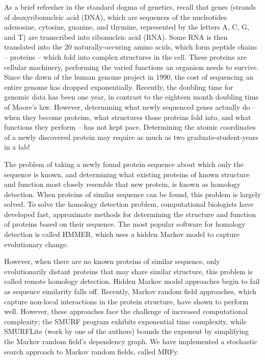 \documentclass[preprint]{sigplanconf}
\begin{document}
As a brief refresher in the standard dogma of genetics, recall that genes 
(strands of deoxyribonucleic acid (DNA), which are sequences of the nucleotides 
adenosine, cytosine, guanine, and thymine, represented by the letters A, C, G, 
and T) are transcribed into ribonucleic acid (RNA). Some RNA is then translated 
into the 20 naturally-occuring amino acids, which form peptide chains -- 
proteins -- which fold into complex structures in the cell. These proteins are 
cellular machinery, performing the varied functions an organism needs to 
survive. Since the dawn of the human genome project in 1990, the cost of 
sequencing an entire genome has dropped exponentially. Recently, the doubling 
time for genomic data has been one year, in contrast to the eighteen month 
doubling time of Moore's law. However, determining what newly sequenced genes 
actually do -- when they become proteins, what structures those proteins fold 
into, and what functions they perform -- has not kept pace. Determining the 
atomic coordinates of a newly discovered protein may require as much as two 
graduate-student-years in a lab!

The problem of taking a newly found protein sequence about which only the 
sequence is known, and determining what existing proteins of known structure 
and function most closely resemble that new protein, is known as homology 
detection. When proteins of similar sequence can be found, this problem is 
largely solved. To solve the homology detection problem, computational 
biologists have developed fast, approximate methods for determining the 
structure and function of proteins based on their sequence. The most popular 
software for homology detection is called HMMER, which uses a hidden Markov 
model to capture evolutionary change.

However, when there are no known proteins of similar sequence, only 
evolutionarily distant proteins that may share similar structure, this problem 
is called remote homology detection. Hidden Markov model approaches begin to 
fail as sequence similarity falls off. Recently, Markov random field 
approaches, which capture non-local interactions in the protein structure, have 
shown to perform well. However, these approaches face the challenge of 
increased computational complexity; the SMURF program exhibits exponential time 
complexity, while SMURFLite (work by one of the authors) bounds the exponent by 
simplifying the Markov random field's dependency graph. We have implemented a 
stochastic search approach to Markov random fields, called MRFy.
\end{document}
